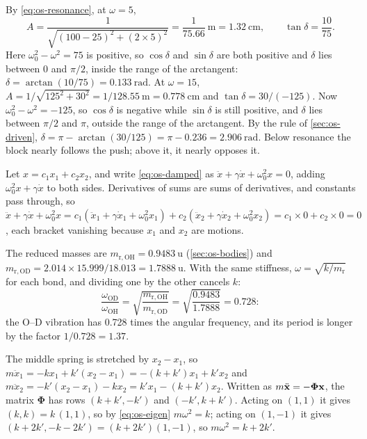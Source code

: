 By \cref{eq:os-resonance}, at $\omega = 5$,
\begin{equation*}
   A = \frac{1}{\sqrt{(100 - 25)^2 + (2\times5)^2}} = \frac{1}{75.66}\
   \si{\metre} = \SI{1.32}{\centi\metre} ,
      \qquad \tan\delta = \frac{10}{75} .
\end{equation*}
Here $\omega_0^2 - \omega^2 = 75$ is positive, so $\cos\delta$ and
$\sin\delta$ are both positive and $\delta$ lies between 0 and $\pi/2$,
inside the range of the arctangent: $\delta = \arctan(10/75) =
\SI{0.133}{\radian}$. At $\omega = 15$, $A = 1/\sqrt{125^2 + 30^2} =
1/128.55\ \si{\metre} = \SI{0.778}{\centi\metre}$ and $\tan\delta =
30/(-125)$. Now $\omega_0^2 - \omega^2 = -125$, so $\cos\delta$ is
negative while $\sin\delta$ is still positive, and $\delta$ lies between
$\pi/2$ and $\pi$, outside the range of the arctangent. By the rule of
\cref{sec:os-driven}, $\delta = \pi - \arctan(30/125) = \pi - 0.236 =
\SI{2.906}{\radian}$. Below resonance the block nearly follows the push;
above it, it nearly opposes it.

Let $x = c_1x_1 + c_2x_2$, and write
\cref{eq:os-damped} as $\ddot{x} + \gamma\dot{x} + \omega_0^2x = 0$,
adding $\omega_0^2x + \gamma\dot{x}$ to both sides. Derivatives of sums
are sums of derivatives, and constants pass through, so $\ddot{x} +
\gamma\dot{x} + \omega_0^2x = c_1(\ddot{x}_1 + \gamma\dot{x}_1 +
\omega_0^2x_1) + c_2(\ddot{x}_2 + \gamma\dot{x}_2 + \omega_0^2x_2) =
c_1\times0 + c_2\times0 = 0$, each bracket vanishing because $x_1$ and
$x_2$ are motions.

The reduced masses are $m_{\mathrm{r},\mathrm{OH}} =
\SI{0.9483}{\amu}$ (\cref{sec:os-bodies}) and $m_{\mathrm{r},\mathrm{OD}} =
2.014\times15.999/18.013 = \SI{1.7888}{\amu}$. With the same stiffness,
$\omega = \sqrt{k/m_{\mathrm r}}$ for each bond, and dividing one by the
other cancels $k$:
\begin{equation*}
   \frac{\omega_{\mathrm{OD}}}{\omega_{\mathrm{OH}}}
   = \sqrt{\frac{m_{\mathrm{r},\mathrm{OH}}}{m_{\mathrm{r},\mathrm{OD}}}}
   = \sqrt{\frac{0.9483}{1.7888}} = 0.728 :
\end{equation*}
the O--D vibration has 0.728 times the angular frequency, and its period
is longer by the factor $1/0.728 = 1.37$.

The middle spring is stretched by $x_2 - x_1$,
so $m\ddot{x}_1 = -kx_1 + k'(x_2 - x_1) = -(k + k')x_1 + k'x_2$ and
$m\ddot{x}_2 = -k'(x_2 - x_1) - kx_2 = k'x_1 - (k + k')x_2$. Written as
$m\ddot{\bm{\mathrm{x}}} = -\boldsymbol{\Phi}\bm{\mathrm{x}}$, the matrix $\boldsymbol{\Phi}$
has rows $(k + k', -k')$ and $(-k', k + k')$. Acting on $(1, 1)$ it gives
$(k, k) = k\,(1, 1)$, so by \cref{eq:os-eigen} $m\omega^2 = k$; acting on $(1, -1)$ it gives $(k + 2k', -k - 2k') = (k +
2k')(1, -1)$, so $m\omega^2 = k + 2k'$.

